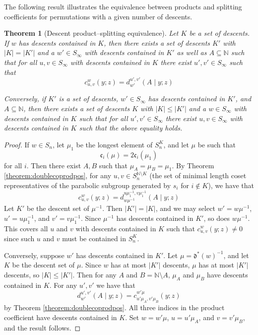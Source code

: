 \documentclass[reqno]{amsart}
\newtheorem{theorem}{Theorem}[section]
\theoremstyle{definition}
\theoremstyle{remark}
\numberwithin{equation}{subsection}
\newcommand{\cpcf}[5]{d^{#1,#2}_{#3}\left(#4\mid #5\right)}
\newcommand{\dom}{\mathfrak{d}}
\newcommand{\ldom}{\dom^*}
\newcommand{\code}{\mathfrak{c}}
\begin{document}
The following result illustrates the equivalence between products and splitting coefficients for permutations with a given number of descents.

\begin{theorem}[Descent product--splitting equivalence] \label{theorem:kstep}
Let $K$ be a set of descents. If $w$ has descents contained in $K$, then there exists a set of descents $K'$ with $|K|=|K'|$ and a $w'\in S_\infty$ with  descents contained in $K'$ as well as $A\subseteq \mathbb{N}$ such that for all $u,v\in S_\infty$ with descents contained in $K$ there exist $u',v'\in S_\infty$ such that
$$c_{u,v}^w(y;z)=\cpcf{u'}{v'}{w'}{A}{y;z}$$

Conversely, if $K'$ is a set of descents, $w'\in S_\infty$ has descents contained in $K'$, and $A\subseteq \mathbb N$, then there exists a set of descents $K$ with $|K|\leq |K'|$ and a $w\in S_\infty$ with descents contained in $K$ such that for all $u',v'\in S_\infty$ there exist $u,v\in S_\infty$ with descents contained in $K$ such that the above equality holds.
\end{theorem}
\begin{proof}
If $w\in S_n$, let $\mu_1$ be the longest element of $S_n^K$, and let $\mu$ be such that
$$\code_i(\mu)=2\code_i(\mu_1)$$
for all $i$. Then there exist $A, B$ such that $\mu_A=\mu_B=\mu_1$. By Theorem \ref{theorem:doublecoprodpos}, for any $u,v\in S_n^{\mathbb{N}\setminus K}$ (the set of minimal length coset representatives of the parabolic subgroup generated by $s_i$ for $i\notin K$), we have that
$$c_{u,v}^w(y;z)=\cpcf{u\mu_1^{-1}}{v\mu_1^{-1}}{w\mu^{-1}}{A}{y;z}$$
Let $K'$ be the descent set of $\mu^{-1}$. Then $|K'|=|K|$, and we may select $w'=w\mu^{-1}$, $u'=u\mu_1^{-1}$, and $v'=v\mu_1^{-1}$. Since $\mu^{-1}$ has descents contained in $K'$, so does $w\mu^{-1}$. This covers all $u$ and $v$ with descents contained in $K$ such that $c_{u,v}^w(y;z)\neq 0$ since such $u$ and $v$ must be contained in $S_n^K$.

Conversely, suppose $w'$ has descents contained in $K'$. Let $\mu=\ldom(w)^{-1}$, and let $K$ be the descent set of $\mu$. Since $w$ has at most $|K'|$ descents, $\mu$ has at most $|K'|$ descents, so $|K|\leq |K'|$. Then for any $A$ and $B=\mathbb{N}\setminus A$, $\mu_A$ and $\mu_B$ have descents contained in $K$. For any $u',v'$ we have that
$$\cpcf{u'}{v'}{w'}{A}{y;z}=c_{u'\mu_A,v'\mu_B}^{w'\mu}(y;z)$$
by Theorem \ref{theorem:doublecoprodpos}. All three indices in the product coefficient have descents contained in $K$. Set $w=w'\mu$, $u=u'\mu_A$, and $v=v'\mu_B$, and the result follows.
\end{proof}
\end{document}
